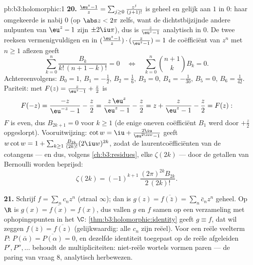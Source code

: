 \begin{solution}{pb:b3:holomorphic:1}
\textbf{20.} $\frac{\eu^z - 1}z = \sum_{j\geq0}\frac{z^j}{(j+1)!}$
is geheel en gelijk aan $1$ in $0$: haar omgekeerde is 
nabij $0$ (op $\abs z < 2\pi$ zelfs, want de dichtstbijzijnde
andere nulpunten van $\eu^z - 1$ zijn $\pm2\iu\pi$), dus is
$\frac z{\eu^z-1}$ analytisch in $0$. De twee reeksen
vermenigvuldigen en in $(\frac{\eu^z-1}z)\cdot(\frac z{\eu^z-1})
= 1$ de coëfficiënt van $z^n$ met $n \geq 1$ aflezen geeft
\[
\sum_{k=0}^{n}\frac{B_k}{k!\,(n+1-k)!} = 0
\quad\Longleftrightarrow\quad
\sum_{k=0}^{n}\binom{n+1}{k}B_k = 0 .
\]
Achtereenvolgens: $B_0 = 1$, $B_1 = -\frac12$, $B_2 = \frac16$,
$B_3 = 0$, $B_4 = -\frac1{30}$, $B_5 = 0$, $B_6 = \frac1{42}$.
Pariteit: met $F(z) = \frac z{\eu^z-1} + \frac z2$ is
\[
F(-z) = \frac{-z}{\eu^{-z} - 1} - \frac z2
= \frac{z\,\eu^z}{\eu^z - 1} - \frac z2
= z + \frac{z}{\eu^z - 1} - \frac z2 = F(z) :
\]
$F$ is even, dus $B_{2k+1} = 0$ voor $k \geq 1$ (de enige oneven
coëfficiënt $B_1$ werd door $+\frac z2$ opgeslorpt). Vooruitwijzing:
$\cot w = \iu + \frac{2\iu}{\eu^{2\iu w}-1}$ geeft $w\cot w = 1 +
\sum_{k\geq1}\frac{B_{2k}}{(2k)!}(2\iu w)^{2k}$, zodat de
laurentcoëfficiënten van de cotangens --- en dus, volgens
\cref{ch:b3:residues}, elke $\zeta(2k)$ --- door de getallen van
Bernoulli worden beprijsd:
\[
\zeta(2k) = (-1)^{k+1}\,\frac{(2\pi)^{2k}B_{2k}}{2\,(2k)!} .
\]

\textbf{21.} Schrijf $f = \sum_nc_nz^n$ (straal $\infty$); dan is
$g(z) = \overline{f(\bar z)} = \sum_n\bar c_nz^n$ geheel. Op $\R$
is $g(x) = \overline{f(x)} = f(x)$, dus vallen $g$ en $f$ samen
op een verzameling met ophopingspunten in het  $\C$:
\cref{thm:b3:holomorphic:identity} geeft $g \equiv f$, dat wil
zeggen $f(\bar z) = \overline{f(z)}$ (gelijkwaardig: alle $c_n$
zijn reëel). Voor een reële veelterm $P$: $P(\bar\alpha) =
\overline{P(\alpha)} = 0$, en dezelfde identiteit toegepast op de
reële afgeleiden $P', P'', \dots$ behoudt de multipliciteiten:
niet-reële wortels vormen paren --- de paring van vraag 8,
analytisch herbewezen.


\end{solution}
